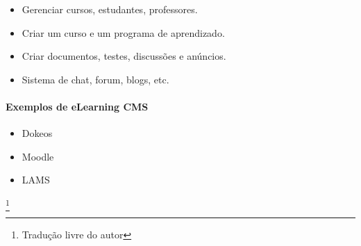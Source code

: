 \begin{itemize}
  \item Gerenciar cursos, estudantes, professores.
  \item Criar um curso e um programa de aprendizado.
  \item Criar documentos, testes, discussões e anúncios.
  \item Sistema de chat, forum, blogs, etc.
\end{itemize}

\paragraph{Exemplos de eLearning CMS} 

\begin{itemize}
  \item Dokeos
  \item Moodle
  \item LAMS
\end{itemize}


\cite{choosing_open_source_cms}\footnote{Tradução livre do autor}


















